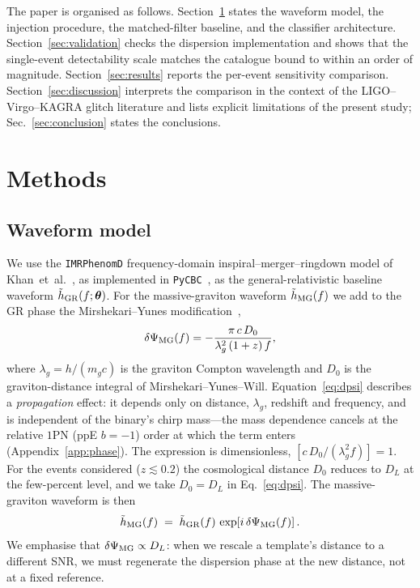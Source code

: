 \documentclass[11pt,a4paper]{article}
\newcommand{\mg}{m_{g}}
\newcommand{\lamg}{\lambda_{g}}
\begin{document}
The paper is organised as follows. Section~\ref{sec:methods} states the
waveform model, the injection procedure, the matched-filter baseline,
and the classifier architecture. Section~\ref{sec:validation} checks the dispersion
implementation and shows that the single-event detectability scale
matches the catalogue bound to within an order of magnitude.
Section~\ref{sec:results} reports the per-event sensitivity comparison.
Section~\ref{sec:discussion} interprets the comparison in the context of
the LIGO--Virgo--KAGRA glitch literature and lists explicit limitations
of the present study; Sec.~\ref{sec:conclusion} states the conclusions.

\section{Methods}\label{sec:methods}

\subsection{Waveform model}\label{sec:waveform}

We use the {\tt IMRPhenomD} frequency-domain inspiral--merger--ringdown
model of Khan~et~al.~\cite{Khan2016,Husa2016}, as implemented in
{\tt PyCBC}~\cite{Usman2016_PyCBC}, as the general-relativistic
baseline waveform $\tilde{h}_{\rm GR}(f;\boldsymbol{\theta})$. For the
massive-graviton waveform $\tilde{h}_{\rm MG}(f)$ we add to the
GR phase the Mirshekari--Yunes
modification~\cite{MirshekariYunesWill2012},
\begin{equation}
  \delta\Psi_{\rm MG}(f) = -\frac{\pi\,c\,D_{0}}{\lamg^{2}\,(1+z)\,f},
  \label{eq:dpsi}
\end{equation}
where $\lamg=h/(\mg c)$ is the graviton Compton wavelength and $D_{0}$ is
the graviton-distance integral of Mirshekari--Yunes--Will. Equation~\eqref{eq:dpsi}
describes a \emph{propagation} effect: it depends only on distance, $\lamg$,
redshift and frequency, and is independent of the binary's chirp mass---the
mass dependence cancels at the relative $1$PN (ppE $b=-1$) order at which the
term enters (Appendix~\ref{app:phase}). The expression is dimensionless,
$[c\,D_{0}/(\lamg^{2}f)]=1$. For the events considered ($z\lesssim 0.2$) the
cosmological distance $D_{0}$ reduces to $D_{L}$ at the few-percent level, and
we take $D_{0}\!=\!D_{L}$ in Eq.~\eqref{eq:dpsi}.
The massive-graviton waveform is then
\begin{equation}
  \tilde{h}_{\rm MG}(f) \;=\; \tilde{h}_{\rm GR}(f)\,\exp\!\left[i\,\delta\Psi_{\rm MG}(f)\right].
  \label{eq:hmg}
\end{equation}
We emphasise that $\delta\Psi_{\rm MG}\propto D_{L}$: when we rescale a
template's distance to a different SNR, we must regenerate the
dispersion phase at the new distance, not at a fixed reference.
\end{document}
